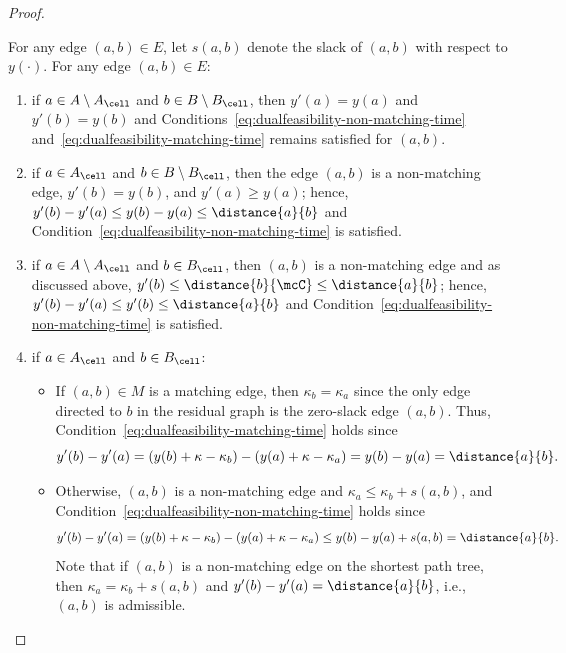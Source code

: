 \begin{proof}
\begin{enumerate}
    \end{enumerate}

     For any edge $(a,b)\in E$, let $s(a,b)$ denote the slack of $(a,b)$ with respect to $y(\cdot)$. For any edge $(a,b)\in E$:
    \begin{enumerate}
        \item if $a\in A\setminus A_\cell$ and $b\in B\setminus B_\cell$, then $y'(a)=y(a)$ and $y'(b)=y(b)$ and Conditions~\eqref{eq:dualfeasibility-non-matching-time} and~\eqref{eq:dualfeasibility-matching-time} remains satisfied for $(a,b)$.
        
        \item if $a\in A_\cell$ and $b\in B\setminus B_\cell$, then the edge $(a,b)$ is a non-matching edge, $y'(b)=y(b)$, and $y'(a)\ge y(a)$; hence, $y'(b)-y'(a)\le y(b)-y(a)\le \distance{a}{b}$ and Condition~\eqref{eq:dualfeasibility-non-matching-time} is satisfied.

        \item if $a\in A\setminus A_\cell$ and $b\in B_\cell$, then $(a,b)$ is a non-matching edge and as discussed above, $y'(b)\le \distance{b}{\mcC}\le \distance{a}{b}$; hence, $y'(b)-y'(a)\le y'(b)\le \distance{a}{b}$ and Condition~\eqref{eq:dualfeasibility-non-matching-time} is satisfied.

        \item if $a\in A_\cell$ and $b\in B_\cell$: 
        \begin{itemize}
            \item If $(a,b)\in M$ is a matching edge, then $\kappa_b = \kappa_a$ since the only edge directed to $b$ in the residual graph is the zero-slack edge $(a,b)$. Thus, Condition~\eqref{eq:dualfeasibility-matching-time} holds since
            \begin{equation*}
            y'(b) - y'(a) = (y(b)+\kappa-\kappa_b) - (y(a)+\kappa-\kappa_a) = y(b)-y(a) = \distance{a}{b}.
            \end{equation*}
            \item Otherwise, $(a,b)$ is a non-matching edge and $\kappa_a\le \kappa_b + s(a,b)$, and Condition~\eqref{eq:dualfeasibility-non-matching-time} holds since
            \begin{equation*}
                y'(b)-y'(a) = (y(b)+\kappa-\kappa_b) - (y(a)+\kappa-\kappa_a) \le y(b)-y(a) + s(a, b) = \distance{a}{b}.
            \end{equation*}
            Note that if $(a,b)$ is a non-matching edge on the shortest path tree, then $\kappa_a= \kappa_b + s(a,b)$ and $y'(b)-y'(a) = \distance{a}{b}$, i.e., $(a,b)$ is admissible.
        \end{itemize}
    \end{enumerate}


\end{proof}
